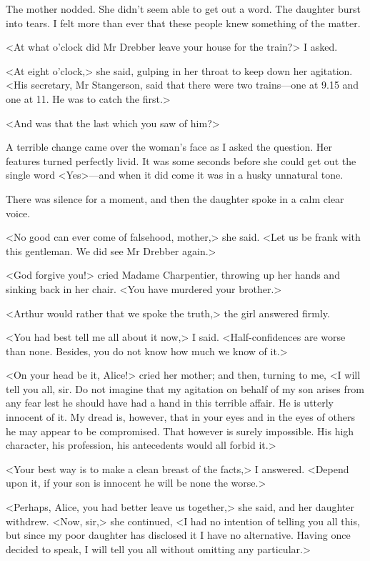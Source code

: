 The mother nodded. She didn't seem able to get out a word. The daughter burst into tears. I felt more than ever that these people knew something of the matter.

<At what o'clock did Mr Drebber leave your house for the train?> I asked.

<At eight o'clock,> she said, gulping in her throat to keep down her agitation. <His secretary, Mr Stangerson, said that there were two trains—one at 9.15 and one at 11. He was to catch the first.>

<And was that the last which you saw of him?>

A terrible change came over the woman's face as I asked the question. Her features turned perfectly livid. It was some seconds before she could get out the single word <Yes>—and when it did come it was in a husky unnatural tone.

There was silence for a moment, and then the daughter spoke in a calm clear voice.

<No good can ever come of falsehood, mother,> she said. <Let us be frank with this gentleman. We did see Mr Drebber again.>

<God forgive you!> cried Madame Charpentier, throwing up her hands and sinking back in her chair. <You have murdered your brother.>

<Arthur would rather that we spoke the truth,> the girl answered firmly.

<You had best tell me all about it now,> I said. <Half-confidences are worse than none. Besides, you do not know how much we know of it.>

<On your head be it, Alice!> cried her mother; and then, turning to me, <I will tell you all, sir. Do not imagine that my agitation on behalf of my son arises from any fear lest he should have had a hand in this terrible affair. He is utterly innocent of it. My dread is, however, that in your eyes and in the eyes of others he may appear to be compromised. That however is surely impossible. His high character, his profession, his antecedents would all forbid it.>

<Your best way is to make a clean breast of the facts,> I answered. <Depend upon it, if your son is innocent he will be none the worse.>

<Perhaps, Alice, you had better leave us together,> she said, and her daughter withdrew. <Now, sir,> she continued, <I had no intention of telling you all this, but since my poor daughter has disclosed it I have no alternative. Having once decided to speak, I will tell you all without omitting any particular.>

